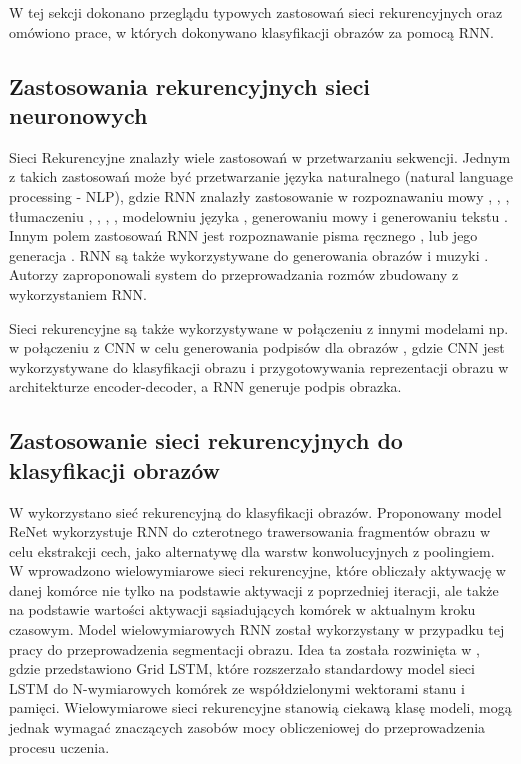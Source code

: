 \documentclass[oneside, mag]{mgr}
\begin{document}
W tej sekcji dokonano przeglądu typowych zastosowań sieci rekurencyjnych oraz omówiono prace, w których dokonywano klasyfikacji obrazów za pomocą RNN.

\subsection{Zastosowania rekurencyjnych sieci neuronowych}

Sieci Rekurencyjne znalazły wiele zastosowań w przetwarzaniu sekwencji. 
Jednym z takich zastosowań może być przetwarzanie języka naturalnego (natural language processing - NLP), gdzie RNN znalazły zastosowanie w rozpoznawaniu mowy \cite{DBLP:journals/corr/abs-1303-5778}, \cite{speech_recognition}, \cite{speech_recognition1}, tłumaczeniu \cite{translate}, \cite{DBLP:journals/corr/ChoMGBSB14}, \cite{DBLP:journals/corr/BahdanauCB14}, \cite{DBLP:journals/corr/WuSCLNMKCGMKSJL16}, modelowniu języka \cite{DBLP:journals/corr/ChoMGBSB14}, generowaniu mowy \cite{DBLP:journals/corr/MehriKGKJSCB16} i generowaniu tekstu \cite{DBLP:journals/corr/Graves13} \cite{karpathy_RNN_blog}. 
Innym polem zastosowań RNN jest rozpoznawanie pisma ręcznego \cite{handwriting_recognition}, \cite{handwriting_recognition2} lub jego generacja \cite{DBLP:journals/corr/Graves13}.
RNN są także wykorzystywane do generowania obrazów \cite{DBLP:journals/corr/GregorDGW15} i muzyki \cite{DBLP:journals/corr/abs-1804-07300}.
Autorzy \cite{DBLP:journals/corr/VinyalsL15} zaproponowali system do przeprowadzania rozmów zbudowany z wykorzystaniem RNN.

Sieci rekurencyjne są także wykorzystywane w połączeniu z innymi modelami np. w połączeniu z CNN w celu generowania podpisów dla obrazów \cite{DBLP:journals/corr/VinyalsTBE14}, gdzie CNN jest wykorzystywane do klasyfikacji obrazu i przygotowywania reprezentacji obrazu w architekturze encoder-decoder, a RNN generuje podpis obrazka.

\subsection{Zastosowanie sieci rekurencyjnych do klasyfikacji obrazów}

W \cite{DBLP:journals/corr/VisinKCMCB15} wykorzystano sieć rekurencyjną do klasyfikacji obrazów. Proponowany model ReNet wykorzystuje RNN do czterotnego trawersowania fragmentów obrazu w celu ekstrakcji cech, jako alternatywę dla warstw konwolucyjnych z poolingiem. W \cite{DBLP:journals/corr/abs-0705-2011} wprowadzono wielowymiarowe sieci rekurencyjne, które obliczały aktywację w danej komórce nie tylko na podstawie aktywacji z poprzedniej iteracji, ale także na podstawie wartości aktywacji sąsiadujących komórek w aktualnym kroku czasowym. Model wielowymiarowych RNN został wykorzystany w przypadku tej pracy do przeprowadzenia segmentacji obrazu. Idea ta została rozwinięta w \cite{DBLP:journals/corr/KalchbrennerDG15}, gdzie przedstawiono Grid LSTM, które rozszerzało standardowy model sieci LSTM do N-wymiarowych komórek ze współdzielonymi wektorami stanu i pamięci. Wielowymiarowe sieci rekurencyjne stanowią ciekawą klasę modeli, mogą jednak wymagać znaczących zasobów mocy obliczeniowej do przeprowadzenia procesu uczenia.
\end{document}
